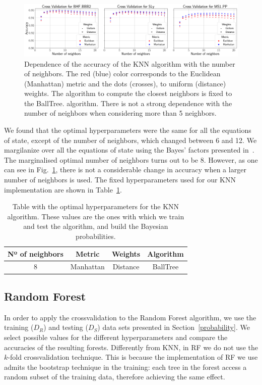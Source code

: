 \begin{figure}%
\includegraphics[width=\linewidth]{cross_val_KNN}
\caption{Dependence of the accuracy of the KNN algorithm with the number of neighbors. The red (blue) color corresponds to the Euclidean (Manhattan) metric and the dots (crosses), to uniform (distance) weights.  The algorithm to compute the closest neighbors is fixed to the BallTree. algorithm.  There is not a strong dependence with the number of neighbors when considering more than 5 neighbors. }
\label{fig:crossvalKNN}
\end{figure}

We found that the optimal hyperparameters were the same for all the equations of state, except of the number of neighbors, which changed between 6 and 12. We margilanize over all the equations of state using the Bayes' factors presented in~\cite{Ghosh:2021eqv}. The marginalised optimal number of neighbors turns out to be 8. However, as one can see in Fig.~\ref{fig:crossvalKNN}, there is not a considerable change in accuracy when a larger number of neighbors is used. The fixed hyperparameters used for our KNN implementation are shown in Table~\ref{tab:KNN_opt_params}.


\begin{table}[h]
\begin{tabular}{c|c|c|c}
\hline
Nº of neighbors   & Metric & Weights & Algorithm  \\ \hline
8  & Manhattan  & Distance & BallTree \\ 
\hline
\end{tabular}
\caption{Table with the optimal hyperparameters for the KNN algorithm. These values are the ones with which we train and test the algorithm, and build the Bayesian probabilities.} \label{tab:KNN_opt_params}
\end{table}


\subsection{Random Forest}

In order to apply the crossvalidation to the Random Forest algorithm, we use the training ($D_R$) and testing ($D_S$) data sets presented in Section~\ref{probability}. We select possible values for the different hyperparameters and compare the accuracies of the resulting forests. Differently from KNN, in RF we do not use the $k$-fold crossvalidation technique. This is because the implementation of RF we use admits the bootstrap technique in the training: each tree in the forest access a random subset of the training data, therefore achieving the same effect.

